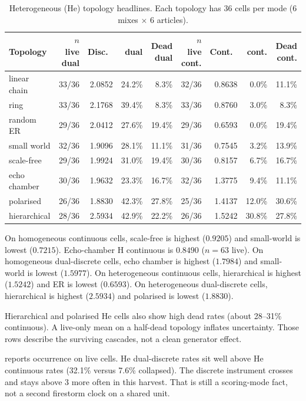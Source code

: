 \begin{table}[p]
\centering
\caption{Heterogeneous (He) topology headlines.
Each topology has 36 cells per mode (6 mixes $\times$ 6 articles).}
\label{tab:topoHe}
\scriptsize
\begin{tabular}{lrrrrrrrr}
\toprule
Topology & $n$ live dual & Disc.\ \MPR{} & \kstar{} dual & Dead dual & $n$ live cont. & Cont.\ \MPR{} & \kstar{} cont. & Dead cont. \\
\midrule
linear chain & 33/36 & 2.0852 & 24.2\% & 8.3\% & 32/36 & 0.8638 & 0.0\% & 11.1\% \\
ring & 33/36 & 2.1768 & 39.4\% & 8.3\% & 33/36 & 0.8760 & 3.0\% & 8.3\% \\
random ER & 29/36 & 2.0412 & 27.6\% & 19.4\% & 29/36 & 0.6593 & 0.0\% & 19.4\% \\
small world & 32/36 & 1.9096 & 28.1\% & 11.1\% & 31/36 & 0.7545 & 3.2\% & 13.9\% \\
scale-free & 29/36 & 1.9924 & 31.0\% & 19.4\% & 30/36 & 0.8157 & 6.7\% & 16.7\% \\
echo chamber & 30/36 & 1.9632 & 23.3\% & 16.7\% & 32/36 & 1.3775 & 9.4\% & 11.1\% \\
polarised & 26/36 & 1.8830 & 42.3\% & 27.8\% & 25/36 & 1.4137 & 12.0\% & 30.6\% \\
hierarchical & 28/36 & 2.5934 & 42.9\% & 22.2\% & 26/36 & 1.5242 & 30.8\% & 27.8\% \\
\bottomrule
\end{tabular}
\end{table}

On homogeneous continuous cells, scale-free is highest ($0.9205$) and small-world is lowest ($0.7215$).
Echo-chamber H continuous is $0.8490$ ($n=63$ live).
On homogeneous dual-discrete cells, echo chamber is highest ($1.7984$) and small-world is lowest ($1.5977$).
On heterogeneous continuous cells, hierarchical is highest ($1.5242$) and ER is lowest ($0.6593$).
On heterogeneous dual-discrete cells, hierarchical is highest ($2.5934$) and polarised is lowest ($1.8830$).

Hierarchical and polarised He cells also show high dead rates (about 28--31\% continuous).
A live-only mean on a half-dead topology inflates uncertainty.
Those rows describe the surviving cascades, not a clean generator effect.

 reports \kstar{} occurrence on live cells.
He dual-discrete \kstar{} rates sit well above He continuous rates (32.1\% versus 7.6\% collapsed).
The discrete instrument crosses and stays above $3$ more often in this harvest.
That is still a scoring-mode fact, not a second firestorm clock on a shared unit.

